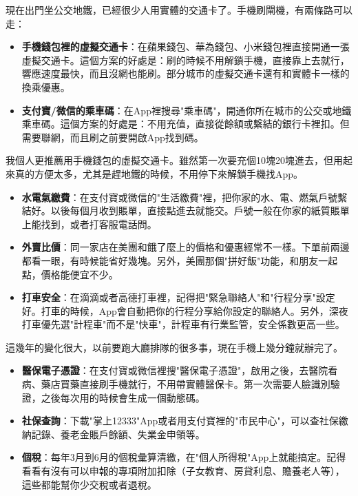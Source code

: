 
現在出門坐公交地鐵，已經很少人用實體的交通卡了。手機刷閘機，有兩條路可以走：

\begin{itemize}
  \item \textbf{手機錢包裡的虛擬交通卡}：在蘋果錢包、華為錢包、小米錢包裡直接開通一張虛擬交通卡。這個方案的好處是：刷的時候不用解鎖手機，直接靠上去就行，響應速度最快，而且沒網也能刷。部分城市的虛擬交通卡還有和實體卡一樣的換乘優惠。
  \item \textbf{支付寶/微信的乘車碼}：在App裡搜尋"乘車碼"，開通你所在城市的公交或地鐵乘車碼。這個方案的好處是：不用充值，直接從餘額或繫結的銀行卡裡扣。但需要聯網，而且刷之前要開啟App找到碼。
\end{itemize}

我個人更推薦用手機錢包的虛擬交通卡。雖然第一次要充個10塊20塊進去，但用起來真的方便太多，尤其是趕地鐵的時候，不用停下來解鎖手機找App。


\begin{itemize}
  \item \textbf{水電氣繳費}：在支付寶或微信的"生活繳費"裡，把你家的水、電、燃氣戶號繫結好。以後每個月收到賬單，直接點進去就能交。戶號一般在你家的紙質賬單上能找到，或者打客服電話問。
  \item \textbf{外賣比價}：同一家店在美團和餓了麼上的價格和優惠經常不一樣。下單前兩邊都看一眼，有時候能省好幾塊。另外，美團那個"拼好飯"功能，和朋友一起點，價格能便宜不少。
  \item \textbf{打車安全}：在滴滴或者高德打車裡，記得把"緊急聯絡人"和"行程分享"設定好。打車的時候，App會自動把你的行程分享給你設定的聯絡人。另外，深夜打車優先選"計程車"而不是"快車"，計程車有行業監管，安全係數更高一些。
\end{itemize}


這幾年的變化很大，以前要跑大廳排隊的很多事，現在手機上幾分鐘就辦完了。

\begin{itemize}
  \item \textbf{醫保電子憑證}：在支付寶或微信裡搜"醫保電子憑證"，啟用之後，去醫院看病、藥店買藥直接刷手機就行，不用帶實體醫保卡。第一次需要人臉識別驗證，之後每次用的時候會生成一個動態碼。
  \item \textbf{社保查詢}：下載"掌上12333"App或者用支付寶裡的"市民中心"，可以查社保繳納記錄、養老金賬戶餘額、失業金申領等。
  \item \textbf{個稅}：每年3月到6月的個稅彙算清繳，在"個人所得稅"App上就能搞定。記得看看有沒有可以申報的專項附加扣除（子女教育、房貸利息、贍養老人等），這些都能幫你少交稅或者退稅。
\end{itemize}

